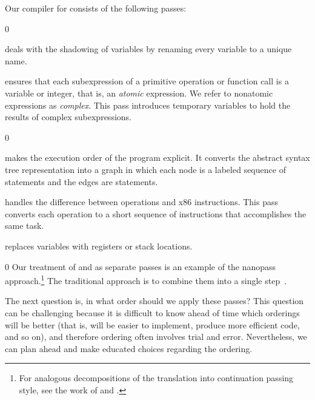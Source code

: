 \documentclass[7x10]{TimesAPriori_MIT}%
\def\racketEd{0}
\def\edition{1}
\numberwithin{theorem}{chapter}
\numberwithin{definition}{chapter}
\numberwithin{equation}{chapter}
\begin{document}
Our compiler for \LangVar{} consists of the following passes:
%
\begin{description}
{\if\edition\racketEd
\item[\key{uniquify}] deals with the shadowing of variables by
  renaming every variable to a unique name.
  \fi}

\item[\key{remove\_complex\_operands}] ensures that each subexpression
  of a primitive operation or function call is a variable or integer,
  that is, an \emph{atomic} expression. We refer to nonatomic
  expressions as \emph{complex}.  This pass introduces temporary
  variables to hold the results of complex
  subexpressions.%
  
{\if\edition\racketEd
\item[\key{explicate\_control}] makes the execution order of the
  program explicit. It converts the abstract syntax tree
  representation into a graph in which each node is a labeled sequence
  of statements and the edges are  statements.
\fi}

\item[\key{select\_instructions}]
  handles the difference between
  \LangVar{} operations and x86 instructions. This pass converts each
  \LangVar{} operation to a short sequence of instructions that
  accomplishes the same task.

\item[\key{assign\_homes}] replaces variables with registers or stack
  locations.
\end{description}
%
{\if\edition\racketEd
%
Our treatment of  and
 as separate passes is an example of the
nanopass approach.\footnote{For analogous decompositions of the
  translation into continuation passing style, see the work of
  \citet{Lawall:1993} and \citet{Hatcliff:1994ea}.} The traditional
approach is to combine them into a single step~\citep{Aho:2006wb}.
%  
\fi}

The next question is, in what order should we apply these passes? This
question can be challenging because it is difficult to know ahead of
time which orderings will be better (that is, will be easier to
implement, produce more efficient code, and so on), and therefore
ordering often involves trial and error. Nevertheless, we can plan
ahead and make educated choices regarding the ordering.
\end{document}
